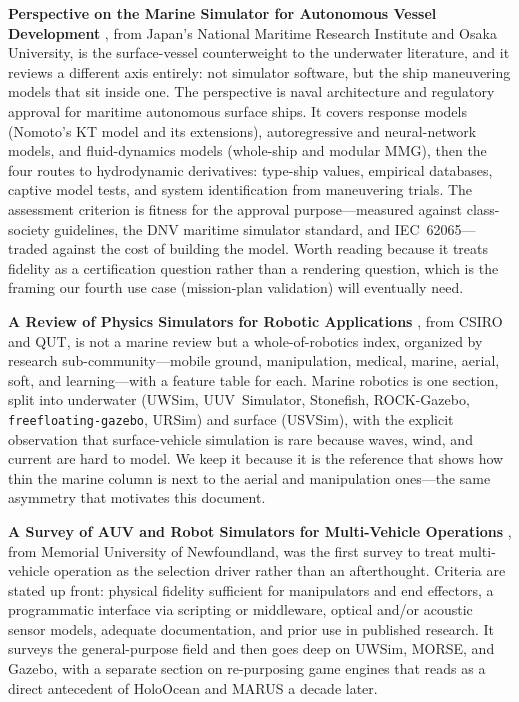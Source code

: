 \documentclass[11pt]{article}
\begin{document}
\textbf{Perspective on the Marine Simulator for Autonomous Vessel Development} \autocite{sawada2024marinesim}, from Japan's National Maritime Research Institute and Osaka University, is the surface-vessel counterweight to the underwater literature, and it reviews a different axis entirely: not simulator software, but the ship maneuvering models that sit inside one. The perspective is naval architecture and regulatory approval for maritime autonomous surface ships. It covers response models (Nomoto's KT model and its extensions), autoregressive and neural-network models, and fluid-dynamics models (whole-ship and modular MMG), then the four routes to hydrodynamic derivatives: type-ship values, empirical databases, captive model tests, and system identification from maneuvering trials. The assessment criterion is fitness for the approval purpose---measured against class-society guidelines, the DNV maritime simulator standard, and IEC~62065---traded against the cost of building the model. Worth reading because it treats fidelity as a certification question rather than a rendering question, which is the framing our fourth use case (mission-plan validation) will eventually need.

\textbf{A Review of Physics Simulators for Robotic Applications} \autocite{collins2021physicssim}, from CSIRO and QUT, is not a marine review but a whole-of-robotics index, organized by research sub-community---mobile ground, manipulation, medical, marine, aerial, soft, and learning---with a feature table for each. Marine robotics is one section, split into underwater (UWSim, UUV~Simulator, Stonefish, ROCK-Gazebo, \texttt{freefloating-gazebo}, URSim) and surface (USVSim), with the explicit observation that surface-vehicle simulation is rare because waves, wind, and current are hard to model. We keep it because it is the reference that shows how thin the marine column is next to the aerial and manipulation ones---the same asymmetry that motivates this document.

\textbf{A Survey of AUV and Robot Simulators for Multi-Vehicle Operations} \autocite{cook2014auvsim}, from Memorial University of Newfoundland, was the first survey to treat multi-vehicle operation as the selection driver rather than an afterthought. Criteria are stated up front: physical fidelity sufficient for manipulators and end effectors, a programmatic interface via scripting or middleware, optical and/or acoustic sensor models, adequate documentation, and prior use in published research. It surveys the general-purpose field and then goes deep on UWSim, MORSE, and Gazebo, with a separate section on re-purposing game engines that reads as a direct antecedent of HoloOcean and MARUS a decade later.
\end{document}
